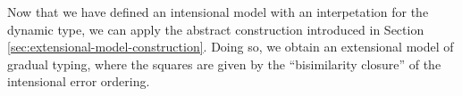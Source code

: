 \begin{comment}
\begin{align*}
\end{align*}

And for the perturbations, we take









\end{comment}



Now that we have defined an intensional model with an interpetation for the dynamic type, we can apply
the abstract construction introduced in Section \ref{sec:extensional-model-construction}.
Doing so, we obtain an extensional model of gradual typing, where the squares are given by the
``bisimilarity closure'' of the intensional error ordering.

 
